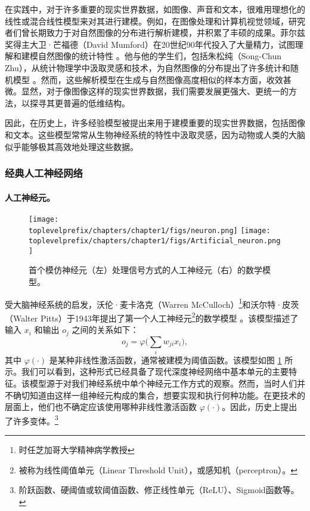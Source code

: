 \documentclass[../../book-main_zh.tex]{subfiles}
\begin{document}
在实践中，对于许多重要的现实世界数据，如图像、声音和文本，很难用理想化的线性或混合线性模型来对其进行建模。例如，在图像处理和计算机视觉领域，研究者们曾长期致力于对自然图像的分布进行解析建模，并积累了丰硕的成果。菲尔兹奖得主大卫·芒福德（David Mumford）在20世纪90年代投入了大量精力，试图理解和建模自然图像的统计特性 \cite{Mumford1996TheSD}。他与他的学生们，包括朱松纯（Song-Chun Zhu），从统计物理学中汲取灵感和技术，为自然图像的分布提出了许多统计和随机模型 \cite{Zhu-Entropy-1997,Zhu1997LearningGP,Zhu1997Prior,Huang-Mumford,Mumford-1999,Lee-Mumford}。然而，这些解析模型在生成与自然图像高度相似的样本方面，收效甚微。显然，对于像图像这样的现实世界数据，我们需要发展更强大、更统一的方法，以探寻其更普遍的低维结构。

因此，在历史上，许多经验模型被提出来用于建模重要的现实世界数据，包括图像和文本。这些模型常常从生物神经系统的特性中汲取灵感，因为动物或人类的大脑似乎能够极其高效地处理这些数据。

\subsubsection{经典人工神经网络}
\paragraph{人工神经元。}

\begin{figure}[t]
    \centering
\texttt{[image: \\toplevelprefix/chapters/chapter1/figs/neuron.png]} \hspace{3mm}   
\texttt{[image: \\toplevelprefix/chapters/chapter1/figs/Artificial\_neuron.png]}
    \caption{首个模仿神经元（左）处理信号方式的人工神经元（右）的数学模型。}
    \label{fig:neuron}
\end{figure}

受大脑神经系统的启发，沃伦·麦卡洛克（Warren McCulloch）\footnote{时任芝加哥大学精神病学教授}和沃尔特·皮茨（Walter Pitts）于1943年提出了第一个人工神经元\footnote{被称为线性阈值单元（Linear Threshold Unit），或感知机（perceptron）。}的数学模型 \cite{McCulloch-Pitts}。该模型描述了输入 $x_i$ 和输出 $o_j$ 之间的关系如下：
\begin{equation}
    o_j = \varphi\Big( \sum_i w_{ji}x_i\Big),  
\end{equation}
其中 $\varphi(\cdot)$ 是某种非线性激活函数，通常被建模为阈值函数。该模型如图 \ref{fig:neuron} 所示。我们可以看到，这种形式已经具备了现代深度神经网络中基本单元的主要特征。该模型源于对我们神经系统中单个神经元工作方式的观察。然而，当时人们并不确切知道由这样一组神经元构成的集合，想要实现和执行何种功能。在更技术的层面上，他们也不确定应该使用哪种非线性激活函数 $\varphi(\cdot)$。因此，历史上提出了许多变体。\footnote{阶跃函数、硬阈值或软阈值函数、修正线性单元（ReLU）、Sigmoid函数等。}
\end{document}
